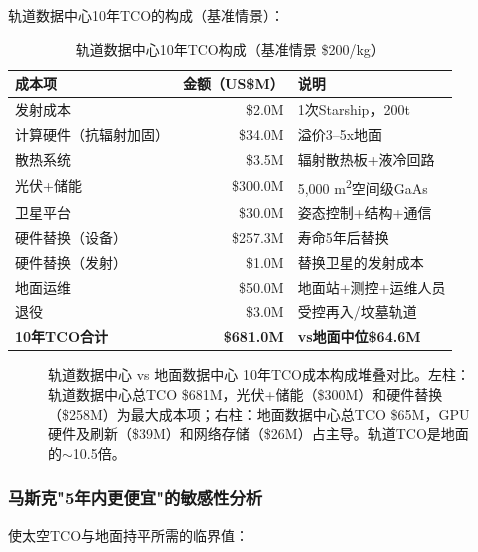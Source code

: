 轨道数据中心10年TCO的构成（基准情景）\cite{note_tco_script}：

\begin{table}[H]
\centering
\caption{轨道数据中心10年TCO构成（基准情景 \$200/kg）}
\label{tab:orbital_detail}
\begin{tabular}{lrl}
\toprule
\textbf{成本项} & \textbf{金额（US\$M）} & \textbf{说明} \\
\midrule
发射成本 & \$2.0M & 1次Starship，200t \\
计算硬件（抗辐射加固） & \$34.0M & 溢价3--5x地面 \\
散热系统 & \$3.5M & 辐射散热板+液冷回路 \\
光伏+储能 & \$300.0M & 5,000 m\textsuperscript{2}空间级GaAs \\
卫星平台 & \$30.0M & 姿态控制+结构+通信 \\
硬件替换（设备） & \$257.3M & 寿命5年后替换 \\
硬件替换（发射） & \$1.0M & 替换卫星的发射成本 \\
地面运维 & \$50.0M & 地面站+测控+运维人员 \\
退役 & \$3.0M & 受控再入/坟墓轨道 \\
\rowcolor{gray!10} \textbf{10年TCO合计} & \textbf{\$681.0M} & \textbf{vs地面中位\$64.6M} \\
\bottomrule
\end{tabular}
\end{table}

\begin{figure}[H]
\centering

\caption{轨道数据中心 vs 地面数据中心 10年TCO成本构成堆叠对比。左柱：轨道数据中心总TCO \$681M，光伏+储能（\$300M）和硬件替换（\$258M）为最大成本项；右柱：地面数据中心总TCO \$65M，GPU硬件及刷新（\$39M）和网络存储（\$26M）占主导。轨道TCO是地面的$\sim$10.5倍。}
\label{fig:tco_breakdown}
\end{figure}

\subsubsection{马斯克"5年内更便宜"的敏感性分析}

使太空TCO与地面持平所需的临界值\cite{pitchbook2026spacex}：

